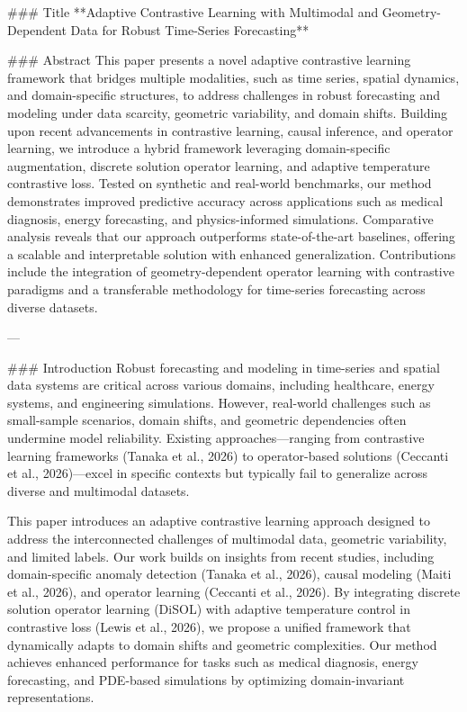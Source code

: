 ### Title
**Adaptive Contrastive Learning with Multimodal and Geometry-Dependent Data for Robust Time-Series Forecasting**

### Abstract
This paper presents a novel adaptive contrastive learning framework that bridges multiple modalities, such as time series, spatial dynamics, and domain-specific structures, to address challenges in robust forecasting and modeling under data scarcity, geometric variability, and domain shifts. Building upon recent advancements in contrastive learning, causal inference, and operator learning, we introduce a hybrid framework leveraging domain-specific augmentation, discrete solution operator learning, and adaptive temperature contrastive loss. Tested on synthetic and real-world benchmarks, our method demonstrates improved predictive accuracy across applications such as medical diagnosis, energy forecasting, and physics-informed simulations. Comparative analysis reveals that our approach outperforms state-of-the-art baselines, offering a scalable and interpretable solution with enhanced generalization. Contributions include the integration of geometry-dependent operator learning with contrastive paradigms and a transferable methodology for time-series forecasting across diverse datasets.

---

### Introduction
Robust forecasting and modeling in time-series and spatial data systems are critical across various domains, including healthcare, energy systems, and engineering simulations. However, real-world challenges such as small-sample scenarios, domain shifts, and geometric dependencies often undermine model reliability. Existing approaches—ranging from contrastive learning frameworks (Tanaka et al., 2026) to operator-based solutions (Ceccanti et al., 2026)—excel in specific contexts but typically fail to generalize across diverse and multimodal datasets.

This paper introduces an adaptive contrastive learning approach designed to address the interconnected challenges of multimodal data, geometric variability, and limited labels. Our work builds on insights from recent studies, including domain-specific anomaly detection (Tanaka et al., 2026), causal modeling (Maiti et al., 2026), and operator learning (Ceccanti et al., 2026). By integrating discrete solution operator learning (DiSOL) with adaptive temperature control in contrastive loss (Lewis et al., 2026), we propose a unified framework that dynamically adapts to domain shifts and geometric complexities. Our method achieves enhanced performance for tasks such as medical diagnosis, energy forecasting, and PDE-based simulations by optimizing domain-invariant representations.

